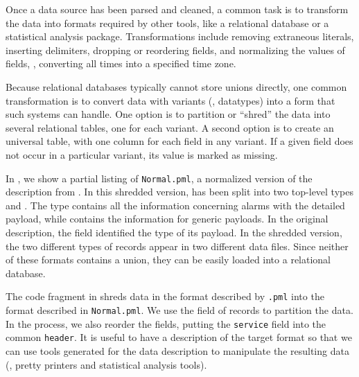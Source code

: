 Once a data source has been parsed and cleaned, a common task is to
transform the data into formats required by other tools, like a
relational database or a statistical analysis package.
Transformations include removing extraneous literals, inserting
delimiters, dropping or reordering fields, and normalizing the values
of fields, \eg{}, converting all times into a specified time zone.

Because relational databases typically cannot store unions directly,
one common transformation is to convert data with variants (\ie{},
datatypes) into a form that such systems can handle.  One option is to
partition or ``shred'' the data into several relational tables, one
for each variant.  A second option is to create an universal table,
with one column for each field in any variant.  If a given field does
not occur in a particular variant, its value is marked as missing.

In , we show a partial listing of
\texttt{\darkstar{}Normal.pml}, a normalized version of the
\darkstar{} description from . In this
shredded version,  has been split into two top-level types
 and .  The type  contains all
the information concerning alarms with the detailed payload, while
 contains the information for generic payloads.  In the
original description, the  field identified the type of its
payload.  In the shredded version, the two different types of records
appear in two different data files. Since neither of these formats
contains a union, they can be easily loaded into a relational
database.

The code fragment in  shreds \darkstar{}
data in the format described by \texttt{\darkstar{}.pml} into the
format described in \texttt{\darkstar{}Normal.pml}.  We use the
 field of  records to partition the data. In the
process, we also reorder the fields, putting the \texttt{service}
field into the common \texttt{header}.  It is useful to have a
\padsml{} description of the target format so that we can use tools
generated for the data description to manipulate the resulting data
(\eg{}, pretty printers and statistical analysis tools).

